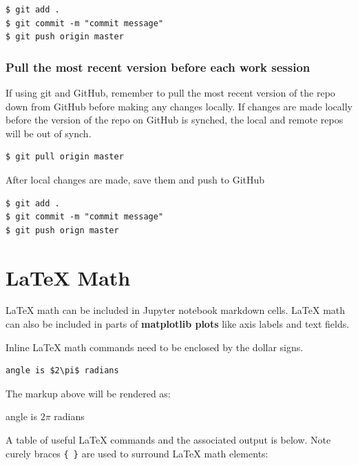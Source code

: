 \documentclass{book}
\begin{document}
\begin{lstlisting}
$ git add .
$ git commit -m "commit message"
$ git push origin master
\end{lstlisting}

\subsubsection{Pull the most recent version before each work
session}\label{pull-the-most-recent-version-before-each-work-session}

If using git and GitHub, remember to pull the most recent version of the
repo down from GitHub before making any changes locally. If changes are
made locally before the version of the repo on GitHub is synched, the
local and remote repos will be out of synch.

\begin{lstlisting}
$ git pull origin master
\end{lstlisting}

After local changes are made, save them and push to GitHub

\begin{lstlisting}
$ git add .
$ git commit -m "commit message"
$ git push orign master
\end{lstlisting}
    




    
        \section{LaTeX Math}\label{latex-math}
    




    
        LaTeX math can be included in Jupyter notebook markdown cells. LaTeX
math can also be included in parts of \textbf{matplotlib plots} like
axis labels and text fields.

Inline LaTeX math commands need to be enclosed by the dollar signs.

\begin{lstlisting}
angle is $2\pi$ radians
\end{lstlisting}

The markup above will be rendered as:

angle is \(2\pi\) radians

A table of useful LaTeX commands and the associated output is below.
Note curely braces \lstinline!{ }! are used to surround LaTeX math
elements:
\end{document}
